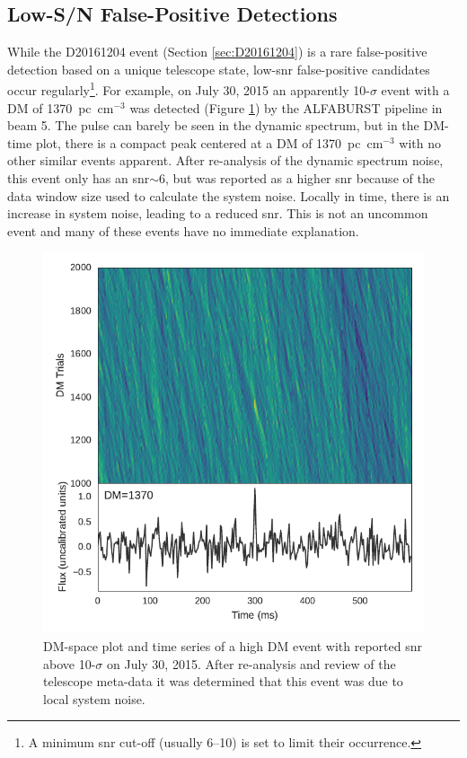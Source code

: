 \documentclass[a4paper,fleqn,usenatbib]{mnras}
\begin{document}
\subsection{Low-S/N False-Positive Detections}
\label{sec:low_snr}

While the D20161204 event (Section \ref{sec:D20161204}) is a rare false-positive
detection based on a unique telescope state, low-\gls{snr} false-positive
candidates occur regularly\footnote{A minimum \gls{snr} cut-off (usually 6--10)
is set to limit their occurrence.}. For example, on July 30, 2015 an apparently
10-$\sigma$ event with a DM of 1370~pc~cm$^{-3}$ was detected (Figure
\ref{fig:D20150730}) by the ALFABURST pipeline in beam 5. The pulse can barely
be seen in the dynamic spectrum, but in the DM-time plot, there is a compact
peak centered at a DM of 1370~pc~cm$^{-3}$ with no other similar events
apparent.  After re-analysis of the dynamic spectrum noise, this event only has
an \gls{snr}$\sim$6, but was reported as a higher \gls{snr} because of the data
window size used to calculate the system noise.  Locally in time, there is an
increase in system noise, leading to a reduced \gls{snr}.  This is not an
uncommon event and many of these events have no immediate explanation.

\begin{figure}
    \includegraphics[width=1.0\linewidth]{figures/D20150730_buf23_Beam6_dmtrial.pdf}
    \caption{DM-space plot and time series of a high DM event with reported
    \gls{snr} above 10-$\sigma$ on July 30, 2015. After re-analysis and review
    of the telescope meta-data it was determined that this event was due to
    local system noise.
    }
    \label{fig:D20150730}
\end{figure}
\end{document}
